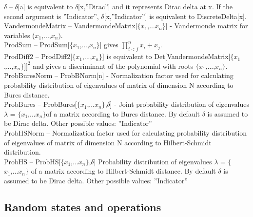 \noindent\textbf{$ \delta  $ }-- $\delta $[a] is equivalent to $\delta $[x,''Dirac''] and it represents Dirac delta at x. If the second argument is ''Indicator'', $\delta $[x,''Indicator''] is equivalent to DiscreteDelta[x].$  $\\
\noindent\textbf{$ \text{VandermondeMatrix} $ }-- VandermondeMatrix[$\{$$ x_1\text{,...}x_n $$\}$] - Vandermonde matrix for variables ($ x_1 $,...,$ x_n\text{).} $\\
\noindent\textbf{$ \text{ProdSum} $ }-- ProdSum[$\{$$ x_1 $,...,$ x_n $$\}$] gives $ \prod _{i<j}^nx_i+x_j. $\\
\noindent\textbf{$ \text{ProdDiff2} $ }-- ProdDiff2[$\{$$ x_1 $,...,$ x_n $$\}$] is equivalent to Det[VandermondeMatrix[$\{$$ x_1 $,...,$ x_n $$\}$]$ ]^2 $ and gives a discriminant of the polynomial with roots $\{$$ x_1 $,...,$ x_n $$\}$.$  $\\
\noindent\textbf{$ \text{ProbBuresNorm} $ }-- ProbBNorm[n] - Normalization factor used for calculating probability distribution of eigenvalues of matrix of dimension N according to Bures distance.$  $\\
\noindent\textbf{$ \text{ProbBures} $ }-- ProbBures[$\{$$ x_1\text{,...}x_n $$\}$,$\delta $] - Joint probability distribution of eigenvalues $\lambda $ = $\{$$ x_1\text{,...}x_n $$\}$of a matrix according to Bures distance. By default $\delta $ is assumed to be Dirac delta. Other possible values: ''Indicator''$  $\\
\noindent\textbf{$ \text{ProbHSNorm} $ }-- Normalization factor used for calculating probability distribution of eigenvalues of matrix of dimension N according to Hilbert-Schmidt distribution.$  $\\
\noindent\textbf{$ \text{ProbHS} $ }-- ProbHS[$\{$$ x_1\text{,...}x_n $$\}$,$\delta $] Probability distribution of eigenvalues $\lambda $ = $\{$$ x_1\text{,...}x_n $$\}$ of a matrix according to Hilbert-Schmidt distance. By default $\delta $ is assumed to be Dirac delta. Other possible values: ''Indicator''$  $\\
\subsection{Random states and operations}


